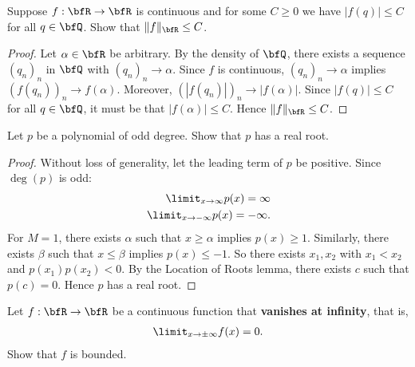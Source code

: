\documentclass[11pt,twoside,openany]{memoir}
\begin{document}
    \begin{exercise}
        Suppose $f:\bfR \rightarrow \bfR$ is continuous and for some $C \geq 0$ we have $|f(q)| \leq C$ for all $q \in \bfQ$. Show that $\lVert f\rVert _\bfR \leq C$.
    \end{exercise}
        \begin{proof}
            Let $\alpha \in \bfR$ be arbitrary. By the density of $\bfQ$, there exists a sequence $(q_n)_n$ in $\bfQ$ with $(q_n)_n \rightarrow \alpha$. Since $f$ is continuous, $(q_n)_n \rightarrow \alpha$ implies $(f(q_n))_n \rightarrow f(\alpha)$. Moreover, $(|f(q_n)|)_n \rightarrow |f(\alpha)|$. Since $|f(q)| \leq C$ for all $q \in \bfQ$, it must be that $|f(\alpha)| \leq C$. Hence $\lVert f \rVert_\bfR \leq C$.
        \end{proof}
    \addtocounter{exercise}{1}
    \addtocounter{exercise}{1}
    \begin{exercise}
        Let $p$ be a polynomial of odd degree. Show that $p$ has a real root.
    \end{exercise}
        \begin{proof}
            Without loss of generality, let the leading term of $p$ be positive. Since $\deg(p)$ is odd:
                \begin{equation*}
                \begin{split}
                    \limit_{x \rightarrow \infty}p(x) = \infty \\
                    \limit_{x \rightarrow -\infty}p(x) = -\infty.
                \end{split}
                \end{equation*}
            For $M=1$, there exists $\alpha$ such that $x \geq \alpha$ implies $p(x) \geq 1$. Similarly, there exists $\beta$ such that $x \leq \beta$ implies $p(x) \leq -1$. So there exists $x_1,x_2$ with $x_1 < x_2$ and $p(x_1)p(x_2) < 0$. By the Location of Roots lemma, there exists $c$ such that $p(c) = 0$. Hence $p$ has a real root.
        \end{proof}
    \begin{exercise}
        Let $f:\bfR \rightarrow \bfR$ be a continuous function that \textbf{vanishes at infinity}, that is,
            \begin{equation*}
            \begin{split}
                \limit_{x \rightarrow \pm \infty}f(x) = 0.
            \end{split}
            \end{equation*}
        Show that $f$ is bounded.
    \end{exercise}
\end{document}
